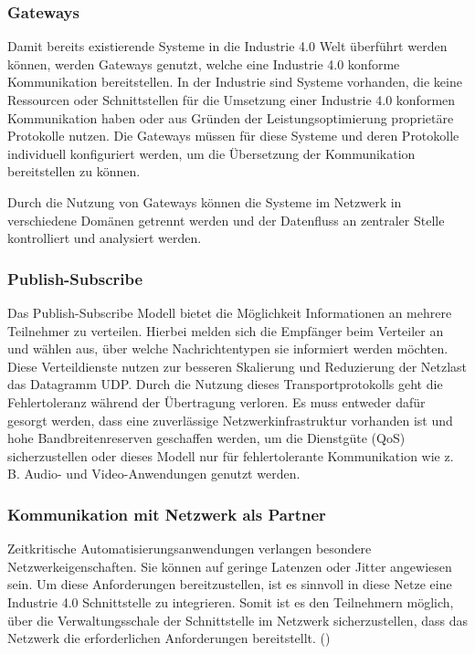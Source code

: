 \subsubsection{Gateways}
Damit bereits existierende Systeme in die Industrie 4.0 Welt überführt werden können, werden Gateways genutzt, welche eine Industrie 4.0 konforme Kommunikation bereitstellen. In der Industrie sind Systeme vorhanden, die keine Ressourcen oder Schnittstellen für die Umsetzung einer Industrie 4.0 konformen Kommunikation haben oder aus Gründen der Leistungsoptimierung proprietäre Protokolle nutzen. Die Gateways müssen für diese Systeme und deren Protokolle individuell konfiguriert werden, um die Übersetzung der Kommunikation bereitstellen zu können.

Durch die Nutzung von Gateways können die Systeme im Netzwerk in verschiedene Domänen getrennt werden und der Datenfluss an zentraler Stelle kontrolliert und analysiert werden.

\subsubsection{Publish-Subscribe}
\label{Grundlagen:Publish-Subscribe}
Das Publish-Subscribe Modell bietet die Möglichkeit Informationen an mehrere Teilnehmer zu verteilen. Hierbei melden sich die Empfänger beim Verteiler an und wählen aus, über welche Nachrichtentypen sie informiert werden möchten. Diese Verteildienste nutzen zur besseren Skalierung und Reduzierung der Netzlast das Datagramm \ac{UDP}. Durch die Nutzung dieses Transportprotokolls geht die Fehlertoleranz während der Übertragung verloren. Es muss entweder dafür gesorgt werden, dass eine zuverlässige Netzwerkinfrastruktur vorhanden ist und hohe Bandbreitenreserven geschaffen werden, um die Dienstgüte (\ac{QoS}) sicherzustellen oder dieses Modell nur für fehlertolerante Kommunikation wie z. B. Audio- und Video-Anwendungen genutzt werden.

\subsubsection{Kommunikation mit Netzwerk als Partner}
Zeitkritische Automatisierungsanwendungen verlangen besondere Netzwerkeigenschaften. Sie können auf geringe Latenzen oder Jitter angewiesen sein. Um diese Anforderungen bereitzustellen, ist es sinnvoll in diese Netze eine Industrie 4.0 Schnittstelle zu integrieren. Somit ist es den Teilnehmern möglich, über die Verwaltungsschale der Schnittstelle im Netzwerk sicherzustellen, dass das Netzwerk die erforderlichen Anforderungen bereitstellt. (\cite{sichKom2017})

